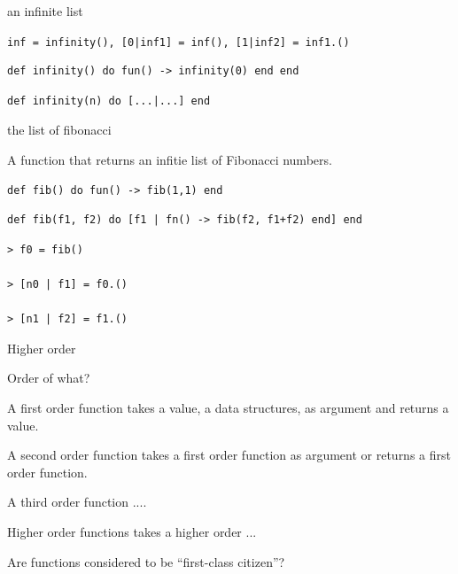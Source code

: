 \begin{frame}[fragile]{an infinite list}

\pause\vspace{20pt}

\verb+inf = infinity()+\pause \verb+, [0|inf1] = inf()+\pause \verb+, [1|inf2] = inf1.()+

\pause
\begin{verbatim}
def infinity() do fun() -> infinity(0) end end
\end{verbatim}
\pause
\begin{verbatim}
def infinity(n) do [...|...] end
\end{verbatim}

\end{frame}


\begin{frame}[fragile]{the list of fibonacci }

A function that returns an infitie list of Fibonacci numbers.

\pause\vspace{20pt}

\begin{verbatim}
def fib() do fun() -> fib(1,1) end
\end{verbatim}
\pause
\begin{verbatim}
def fib(f1, f2) do [f1 | fn() -> fib(f2, f1+f2) end] end
\end{verbatim}

\pause\vspace{20pt}

\begin{verbatim}
> f0 = fib()

> [n0 | f1] = f0.()

> [n1 | f2] = f1.()
\end{verbatim}

\end{frame}

\begin{frame}{Higher order}

Order of what?

\pause\vspace{20pt}
A first order function takes a value, a data structures, as argument and returns a value.

\pause\vspace{20pt}
A second order function takes a first order function as argument or returns a first order function.

\pause\vspace{20pt}
A third order function ....

\pause\vspace{20pt}
Higher order functions takes a higher order ...

\pause\vspace{20pt}
Are functions considered to be ``first-class citizen''?
\end{frame}


